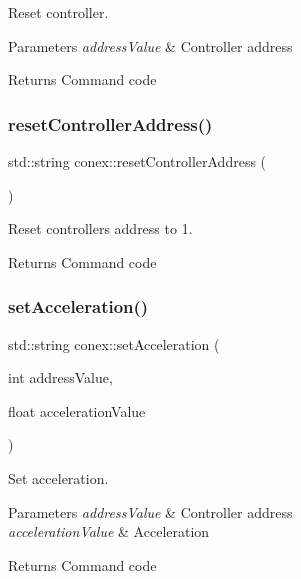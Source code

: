 Reset controller. 


\begin{DoxyParams}{Parameters}
{\em address\+Value} & Controller address \\
\hline
\end{DoxyParams}
\begin{DoxyReturn}{Returns}
Command code 
\end{DoxyReturn}
\mbox{\label{namespaceconex_a4dd4ee5bd3729fc3cbf6e6f70f141baf}} 
\subsubsection{\texorpdfstring{reset\+Controller\+Address()}{resetControllerAddress()}}
{\footnotesize\ttfamily std\+::string conex\+::reset\+Controller\+Address (\begin{DoxyParamCaption}{ }\end{DoxyParamCaption})}



Reset controller\textquotesingle{}s address to 1. 

\begin{DoxyReturn}{Returns}
Command code 
\end{DoxyReturn}
\mbox{\label{namespaceconex_ae90d099ece6fb06e8eeb4ab3ad5df2bb}} 
\subsubsection{\texorpdfstring{set\+Acceleration()}{setAcceleration()}}
{\footnotesize\ttfamily std\+::string conex\+::set\+Acceleration (\begin{DoxyParamCaption}\item[{int}]{address\+Value,  }\item[{float}]{acceleration\+Value }\end{DoxyParamCaption})}



Set acceleration. 


\begin{DoxyParams}{Parameters}
{\em address\+Value} & Controller address \\
\hline
{\em acceleration\+Value} & Acceleration \\
\hline
\end{DoxyParams}
\begin{DoxyReturn}{Returns}
Command code 
\end{DoxyReturn}
\mbox{\label{namespaceconex_a8668932baaa1ff47f4bf37d6dabb1c42}} 
